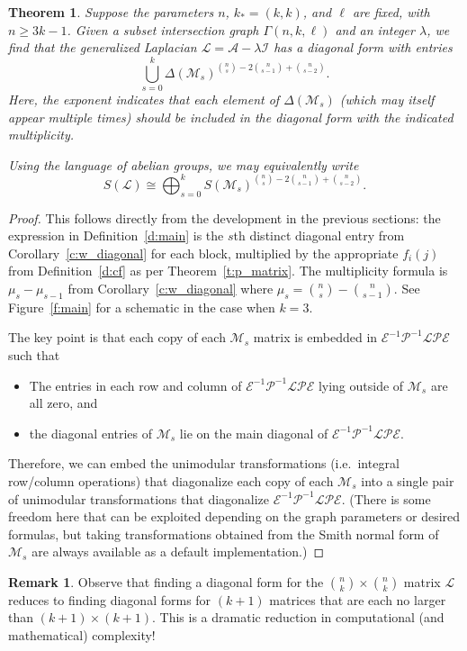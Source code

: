 \documentclass[11pt]{article}
\newtheorem{theorem}[theo]{Theorem}
\theoremstyle{definition}
\newtheorem{remark}[theo]{Remark}
\providecommand{\ie}{i.e.\ }
\numberwithin{equation}{section}
\numberwithin{equation}{section}
\renewcommand{\L}{\mathcal{L}}
\renewcommand{\P}{\mathcal{P}}
\newcommand{\M}{\mathcal{M}}
\newcommand{\E}{\mathcal{E}}
\newcommand{\I}{\mathcal{I}}
\newcommand{\A}{\mathcal{A}}
\newcommand{\kk}{{k}_{\mathsf{*}}}
\newcommand{\G}[0]{\Gamma}
\begin{document}
\begin{theorem}\label{t:main}
Suppose the parameters $n$, $\kk = (k,k)$, and $\ell$ are fixed, with $n \geq 3k-1$.  Given a subset intersection graph $\G(n, k, \ell)$ and an integer $\lambda$, we find that the generalized Laplacian $\L = \A - \lambda \I$ has a diagonal form with entries
\[ \bigcup_{s = 0}^k \Delta(\M_s)^{ \binom{n}{s} - 2 \binom{n}{s-1} + \binom{n}{s-2}}. \]
Here, the exponent indicates that each element of $\Delta(\M_s)$ (which may itself appear multiple times) should be included in the diagonal form with the indicated multiplicity.

Using the language of abelian groups, we may equivalently write
\[
S(\L) \cong \bigoplus_{s=0}^{k} S(\M_s)^{ \binom{n}{s} - 2 \binom{n}{s-1} + \binom{n}{s-2}}.
\]
\end{theorem}
\begin{proof}
This follows directly from the development in the previous sections:  the expression in Definition~\ref{d:main} is the $s$th distinct diagonal entry from Corollary~\ref{c:w_diagonal} for each block, multiplied by the appropriate $f_i(j)$ from Definition~\ref{d:cf} as per Theorem~\ref{t:p_matrix}.  
The multiplicity formula is $\mu_s - \mu_{s-1}$ from Corollary~\ref{c:w_diagonal} where $\mu_s = \binom{n}{s} - \binom{n}{s-1}$.
See Figure~\ref{f:main} for a schematic in the case when $k=3$.

The key point is that each copy of each $\M_s$ matrix is embedded in $\E^{-1} \P^{-1} \L \P \E$ such that
\begin{itemize}
    \item The entries in each row and column of $\E^{-1} \P^{-1} \L \P \E$ lying outside of $\M_s$ are all zero, and
    \item the diagonal entries of $\M_s$ lie on the main diagonal of $\E^{-1} \P^{-1} \L \P \E$.
\end{itemize}
Therefore, we can embed the unimodular transformations (\ie integral row/column operations) that diagonalize each copy of each $\M_s$ into a single pair of unimodular transformations that diagonalize $\E^{-1} \P^{-1} \L \P \E$.  (There is some freedom here that can be exploited depending on the graph parameters or desired formulas, but taking transformations obtained from the Smith normal form of $\M_s$ are always available as a default implementation.)
\end{proof}

\begin{remark}
Observe that finding a diagonal form for the $\binom{n}{k} \times \binom{n}{k}$ matrix $\L$ reduces to finding diagonal forms for $(k+1)$ matrices that are each no larger than \mbox{$(k+1) \times (k+1)$}.  This is a dramatic reduction in computational (and mathematical) complexity!
\end{remark}
\end{document}
